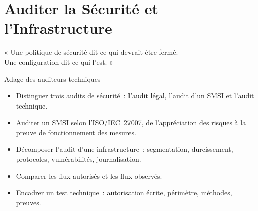 
\chapter{Auditer la Sécurité et l'Infrastructure}
\label{chap:audit-securite}

\epigraph{%
    « Une politique de sécurité dit ce qui devrait être fermé.\\
    Une configuration dit ce qui l'est. »%
}{Adage des auditeurs techniques}


\begin{boxobjectifs}
\begin{itemize}
    \item Distinguer trois audits de sécurité~: l'audit légal, l'audit d'un
          SMSI et l'audit technique.
    \item Auditer un SMSI selon l'ISO/IEC~27007, de l'appréciation des
          risques à la preuve de fonctionnement des mesures.
    \item Décomposer l'audit d'une infrastructure~: segmentation,
          durcissement, protocoles, vulnérabilités, journalisation.
    \item Comparer les flux autorisés et les flux observés.
    \item Encadrer un test technique~: autorisation écrite, périmètre,
          méthodes, preuves.
\end{itemize}
\end{boxobjectifs}

